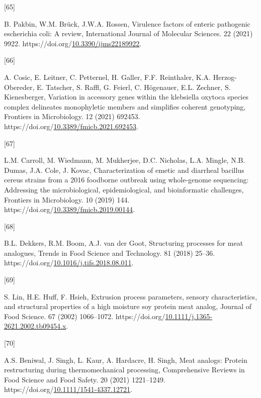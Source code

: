\documentclass[preprint,3p,
a4paper]{elsarticle} %
\newlength{\cslhangindent}
\newlength{\csllabelwidth}
\newlength{\cslentryspacingunit} %
\newenvironment{CSLReferences}[2] %
 {%
  \setlength{\parindent}{0pt}
  \ifodd #1
  \let\oldpar\par
  \def\par{\hangindent=\cslhangindent\oldpar}
  \fi
  \setlength{\parskip}{#2\cslentryspacingunit}
 }%
 {}
\newcommand{\CSLLeftMargin}[1]{\parbox[t]{\csllabelwidth}{#1}}
\newcommand{\CSLRightInline}[1]{\parbox[t]{\linewidth - \csllabelwidth}{#1}\break}
\begin{document}
\begin{CSLReferences}{0}{0}
\leavevmode{}%
\CSLLeftMargin{{[}65{]} }%
\CSLRightInline{B. Pakbin, W.M. Brück, J.W.A. Rossen, Virulence factors
of enteric pathogenic escherichia coli: A review, International Journal
of Molecular Sciences. 22 (2021) 9922.
https://doi.org/\href{https://doi.org/10.3390/ijms22189922}{10.3390/ijms22189922}.}

\leavevmode{}%
\CSLLeftMargin{{[}66{]} }%
\CSLRightInline{A. Cosic, E. Leitner, C. Petternel, H. Galler, F.F.
Reinthaler, K.A. Herzog-Obereder, E. Tatscher, S. Raffl, G. Feierl, C.
Högenauer, E.L. Zechner, S. Kienesberger, Variation in accessory genes
within the klebsiella oxytoca species complex delineates monophyletic
members and simplifies coherent genotyping, Frontiers in Microbiology.
12 (2021) 692453.
https://doi.org/\href{https://doi.org/10.3389/fmicb.2021.692453}{10.3389/fmicb.2021.692453}.}

\leavevmode{}%
\CSLLeftMargin{{[}67{]} }%
\CSLRightInline{L.M. Carroll, M. Wiedmann, M. Mukherjee, D.C. Nicholas,
L.A. Mingle, N.B. Dumas, J.A. Cole, J. Kovac, Characterization of emetic
and diarrheal bacillus cereus strains from a 2016 foodborne outbreak
using whole-genome sequencing: Addressing the microbiological,
epidemiological, and bioinformatic challenges, Frontiers in
Microbiology. 10 (2019) 144.
https://doi.org/\href{https://doi.org/10.3389/fmicb.2019.00144}{10.3389/fmicb.2019.00144}.}

\leavevmode{}%
\CSLLeftMargin{{[}68{]} }%
\CSLRightInline{B.L. Dekkers, R.M. Boom, A.J. van der Goot, Structuring
processes for meat analogues, Trends in Food Science and Technology. 81
(2018) 25--36.
https://doi.org/\href{https://doi.org/10.1016/j.tifs.2018.08.011}{10.1016/j.tifs.2018.08.011}.}

\leavevmode{}%
\CSLLeftMargin{{[}69{]} }%
\CSLRightInline{S. Lin, H.E. Huff, F. Hsieh, Extrusion process
parameters, sensory characteristics, and structural properties of a high
moisture soy protein meat analog, Journal of Food Science. 67 (2002)
1066--1072.
https://doi.org/\href{https://doi.org/10.1111/j.1365-2621.2002.tb09454.x}{10.1111/j.1365-2621.2002.tb09454.x}.}

\leavevmode{}%
\CSLLeftMargin{{[}70{]} }%
\CSLRightInline{A.S. Beniwal, J. Singh, L. Kaur, A. Hardacre, H. Singh,
Meat analogs: Protein restructuring during thermomechanical processing,
Comprehensive Reviews in Food Science and Food Safety. 20 (2021)
1221--1249.
https://doi.org/\href{https://doi.org/10.1111/1541-4337.12721}{10.1111/1541-4337.12721}.}


\end{CSLReferences}
\end{document}
